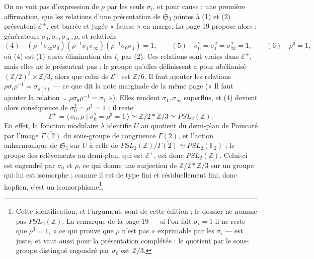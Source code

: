 \documentclass[11pt,a4paper]{article}
\begin{document}
On ne voit pas d'expression de $\rho$ par les seuls $\sigma_i$, et pour cause :
une première affirmation, que les relations d'une présentation de
$\mathfrak{S}_3$ jointes à (1) et (2) présentent $\mathcal{E}^{+}$, est barrée et
jugée « fausse » en marge. La page 19 propose alors : générateurs $\sigma_0,
\sigma_1, \sigma_\infty, \rho$, et relations
\[
(4)\quad (\rho^{-1}\sigma_\infty\sigma_0)(\rho^{-1}\sigma_1\sigma_\infty)
(\rho^{-1}\sigma_0\sigma_1) = 1, \qquad
(5)\quad \sigma_0^2 = \sigma_1^2 = \sigma_\infty^2 = 1, \qquad
(6)\quad \rho^3 = 1,
\]
où (4) est (1) après élimination des $l_i$ par (2). Ces relations sont vraies
dans $\mathcal{E}^{+}$, mais elles ne le présentent pas : le groupe qu'elles
définissent a pour abélianisé $(\mathbb{Z}/2)^3 \times \mathbb{Z}/3$, alors que
celui de $\mathcal{E}^{+}$ est $\mathbb{Z}/6$. Il faut ajouter les relations
$\rho\sigma_i\rho^{-1} = \sigma_{\rho(i)}$ — ce que dit la note marginale de la
même page (« Il faut ajouter la relation \ldots{} $\rho\sigma_0\rho^{-1} =
\sigma_1$ »). Elles rendent $\sigma_1, \sigma_\infty$ superflus, et (4) devient
alors conséquence de $\sigma_0^2 = \rho^3 = 1$ ; il reste
\[
\mathcal{E}^{+} = \langle\, \sigma_0, \rho \mid \sigma_0^2 = \rho^3 = 1 \,\rangle
\simeq \mathbb{Z}/2 * \mathbb{Z}/3 \simeq PSL_2(\mathbb{Z}) .
\]
En effet, la fonction modulaire $\lambda$ identifie $U$ au quotient du
demi-plan de Poincaré par l'image $\overline{\Gamma(2)}$ du sous-groupe de
congruence $\Gamma(2)$, et l'action anharmonique de $\mathfrak{S}_3$ sur $U$ à
celle de $PSL_2(\mathbb{Z})/\overline{\Gamma(2)} \simeq PSL_2(\mathbb{F}_2)$ ;
le groupe des relèvements au demi-plan, qui est $\mathcal{E}^{+}$, est donc
$PSL_2(\mathbb{Z})$. Celui-ci est engendré par $\sigma_0$ et $\rho$, ce qui
donne une surjection de $\mathbb{Z}/2 * \mathbb{Z}/3$ sur un groupe qui lui est
isomorphe ; comme il est de type fini et résiduellement fini, donc hopfien,
c'est un isomorphisme\footnote{Cette identification, et l'argument, sont de
cette édition ; le dossier ne nomme pas $PSL_2(\mathbb{Z})$. La remarque de la
page 19 — si l'on fait $\sigma_i = 1$ il ne reste que $\rho^3 = 1$, « ce qui
prouve que $\rho$ n'est pas » exprimable par les $\sigma_i$ — est juste, et
vaut aussi pour la présentation complétée : le quotient par le sous-groupe
distingué engendré par $\sigma_0$ est $\mathbb{Z}/3$.}.
\end{document}

